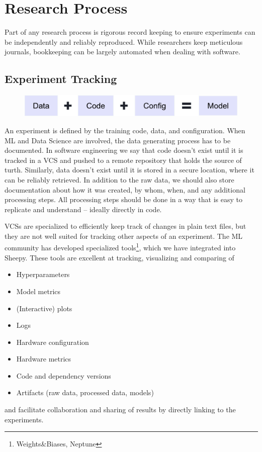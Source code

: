 
\section{Research Process}
Part of any research process is rigorous record keeping to ensure experiments can be independently and reliably reproduced.
While researchers keep meticulous journals, bookkeeping can be largely automated when dealing with software.

\subsection{Experiment Tracking}
\begin{figure}[h]
    \includegraphics[width=\linewidth]{chapters/NLP/figures/model.png}
    \label{fig:model}
\end{figure}
An experiment is defined by the training code, data, and configuration.
When ML and Data Science are involved, the data generating process has to be documented.
In software engineering we say that code doesn't exist until it is tracked in a VCS and pushed to a remote repository that holds the source of turth.
Similarly, data doesn't exist until it is stored in a secure location, where it can be reliably retrieved.
In addition to the raw data, we should also store documentation about how it was created, by whom, when, and any additional processing steps.
All processing steps should be done in a way that is easy to replicate and understand -- ideally directly in code.

VCSs are specialized to efficiently keep track of changes in plain text files, but they are not well suited for tracking other aspects of an experiment.
The ML community has developed specialized tools\footnote{Weights\&Biases, Neptune}, which we have integrated into Sheepy.
These tools are excellent at tracking, visualizing and comparing of
\begin{itemize}
    \item Hyperparameters
    \item Model metrics
    \item (Interactive) plots
    \item Logs
    \item Hardware configuration
    \item Hardware metrics
    \item Code and dependency versions
    \item Artifacts (raw data, processed data, models)
\end{itemize}
and facilitate collaboration and sharing of results by directly linking to the experiments.


